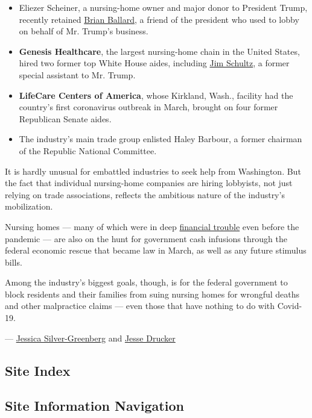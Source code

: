 \begin{itemize}
\item
  Eliezer Scheiner, a nursing-home owner and major donor to President
  Trump, recently retained
  \href{http://ballardpartners.com/the-team/brian-d-ballard/}{Brian
  Ballard}, a friend of the president who used to lobby on behalf of Mr.
  Trump's business.
\item
  \textbf{Genesis Healthcare}, the largest nursing-home chain in the
  United States, hired two former top White House aides, including
  \href{https://www.cozen.com/people/bios/schultz-james}{Jim Schultz}, a
  former special assistant to Mr. Trump.
\item
  \textbf{LifeCare Centers of America}, whose Kirkland, Wash., facility
  had the country's first coronavirus outbreak in March, brought on four
  former Republican Senate aides.
\item
  The industry's main trade group enlisted Haley Barbour, a former
  chairman of the Republic National Committee.
\end{itemize}

It is hardly unusual for embattled industries to seek help from
Washington. But the fact that individual nursing-home companies are
hiring lobbyists, not just relying on trade associations, reflects the
ambitious nature of the industry's mobilization.

Nursing homes --- many of which were in deep
\href{https://www.nytimes3xbfgragh.onion/2020/05/07/business/coronavirus-nursing-homes.html}{financial
trouble} even before the pandemic --- are also on the hunt for
government cash infusions through the federal economic rescue that
became law in March, as well as any future stimulus bills.

Among the industry's biggest goals, though, is for the federal
government to block residents and their families from suing nursing
homes for wrongful deaths and other malpractice claims --- even those
that have nothing to do with Covid-19.

---
\href{https://www.nytimes3xbfgragh.onion/by/jessica-silver-greenberg}{Jessica
Silver-Greenberg} and
\href{https://www.nytimes3xbfgragh.onion/by/jesse-drucker}{Jesse
Drucker}

\hypertarget{site-index}{%
\subsection{Site Index}\label{site-index}}

\hypertarget{site-information-navigation}{%
\subsection{Site Information
Navigation}\label{site-information-navigation}}

